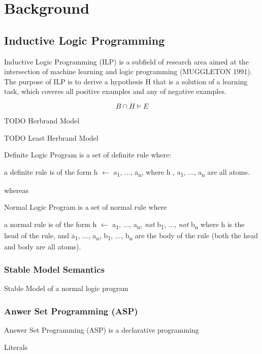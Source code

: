 \documentclass[12pt,twoside]{report}
\begin{document}
\chapter{Background}
\section{Inductive Logic Programming}
Inductive Logic Programming (ILP) is a subfield of research area aimed at the intersection of machine learning and logic programming (MUGGLETON 1991). The purpose of ILP is to derive a hypothesis H that is a solution of a learning task, which coveres all positive examples and any of negative examples.

\begin{equation}
B \cap H \models E
\end{equation}

TODO Herbrand Model

TODO Least Herbrand Model

Definite Logic Program is a set of definite rule where: \newline

a definite rule is of the form h $\leftarrow$ a\textsubscript{1}, ..., a\textsubscript{n}, where h , a\textsubscript{1}, ..., a\textsubscript{n} are all atoms.

whereas

Normal Logic Program is a set of normal rule where

a normal rule is of the form h $\leftarrow$ a\textsubscript{1}, ..., a\textsubscript{n}, \textit{not} b\textsubscript{1}, ..., \textit{not}  b\textsubscript{n} where h is the head of the rule,
 and a\textsubscript{1}, ..., a\textsubscript{n}, b\textsubscript{1}, ..., b\textsubscript{n} are the body of the rule (both the head and body are all atoms).

\subsection{Stable Model Semantics}

Stable Model of a normal logic program

\subsection{Anwer Set Programming (ASP)}

Answer Set Programming (ASP) is a declarative programming


Literals
\end{document}
